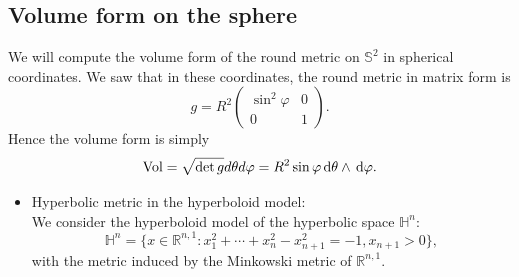 \documentclass{report}
\begin{document}
\subsection{Volume form on the sphere}
We will compute the volume form of the round metric on $\mathbb S^2$ in spherical coordinates.
We saw that in these coordinates, the round metric in matrix form is
\[
g = R^2 \begin{pmatrix}
\sin^2 \varphi & 0 \\
0 & 1
\end{pmatrix}.
\]
Hence the volume form is simply
\[
\text{Vol} = \sqrt{\det g} d\theta d\varphi = R^2 \sin \varphi \,\mathrm{d}\theta \wedge \,\mathrm{d}\varphi.
\]
\begin{itemize}
    
    \item Hyperbolic metric in the hyperboloid model:\\
    We consider the hyperboloid model of the hyperbolic space $\mathbb H^n$:
    \[
    \mathbb H^n = \{x \in \mathbb R^{n,1}: x_1^2 + \cdots + x_n^2 - x_{n+1}^2 = -1, x_{n+1} > 0\},
    \]
    with the metric induced by the Minkowski metric of $\mathbb R^{n,1}$.
    

\end{itemize}
\end{document}
